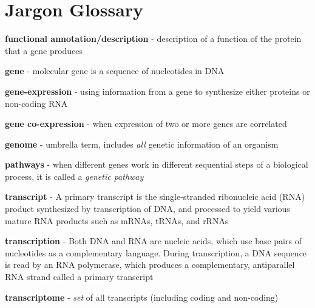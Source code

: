 \section{Jargon Glossary}
		
    \begin{mybox}
        \textbf{functional annotation/description} - description of a function of the protein that a gene produces
    \end{mybox}
    \begin{mybox}
        \textbf{gene} - molecular gene is a sequence of nucleotides in DNA
    \end{mybox}
    \begin{mybox}
        \textbf{gene-expression} - using information from a gene to synthesize either proteins or non-coding RNA
    \end{mybox}
    \begin{mybox}
        \textbf{gene co-expression} - when expression of two or more genes are correlated
    \end{mybox}
    \begin{mybox}
        \textbf{genome} - umbrella term, includes \textit{all} genetic information of an organism
    \end{mybox}
    \begin{mybox}
        \textbf{pathways} - when different genes work in different sequential steps of a biological process, it is called a \textit{genetic pathway}
    \end{mybox}
    \begin{mybox}
        \textbf{transcript} - A primary transcript is the single-stranded ribonucleic acid (RNA) product synthesized by transcription of DNA, and processed to yield various mature RNA products such as mRNAs, tRNAs, and rRNAs
    \end{mybox}
    \begin{mybox}
        \textbf{transcription} - Both DNA and RNA are nucleic acids, which use base pairs of nucleotides as a complementary language. During transcription, a DNA sequence is read by an RNA polymerase, which produces a complementary, antiparallel RNA strand called a primary transcript
    \end{mybox}
    \begin{mybox}
        \textbf{transcriptome}  - \textit{set} of all transcripts (including coding and non-coding)
    \end{mybox}
